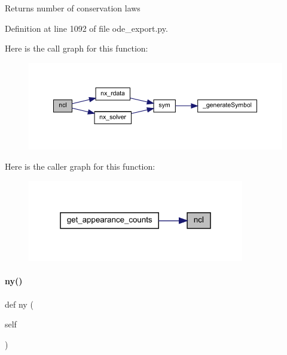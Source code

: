 \begin{DoxyReturn}{Returns}
number of conservation laws 
\end{DoxyReturn}


Definition at line 1092 of file ode\+\_\+export.\+py.

Here is the call graph for this function\+:
\nopagebreak
\begin{figure}[H]
\begin{center}
\leavevmode
\includegraphics[width=350pt]{classamici_1_1ode__export_1_1_o_d_e_model_a96964f4a635095d20c61f4976fd3070c_cgraph}
\end{center}
\end{figure}
Here is the caller graph for this function\+:
\nopagebreak
\begin{figure}[H]
\begin{center}
\leavevmode
\includegraphics[width=268pt]{classamici_1_1ode__export_1_1_o_d_e_model_a96964f4a635095d20c61f4976fd3070c_icgraph}
\end{center}
\end{figure}
\mbox{\label{classamici_1_1ode__export_1_1_o_d_e_model_ac3d9b681827ebea0e5bee18c9d7fc44d}} 
\paragraph{\texorpdfstring{ny()}{ny()}}
{\footnotesize\ttfamily def ny (\begin{DoxyParamCaption}\item[{}]{self }\end{DoxyParamCaption})}

